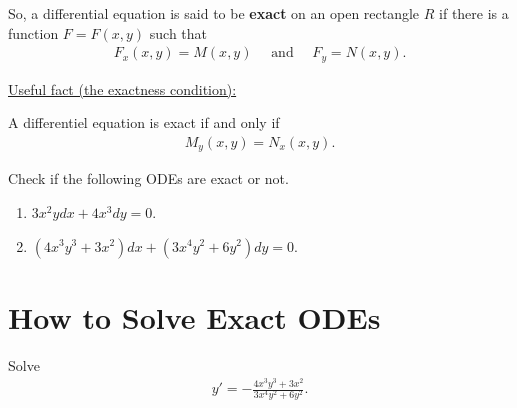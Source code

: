 \documentclass[12pt,a4paper]{article}
\newcounter{example}[section]
\begin{document}
	\newpage
	
	So, a differential equation is said to be \textbf{exact} on an open rectangle $R$ if there is a function $F = F(x, y)$ such that
		\begin{align*}
		F_x (x, y) = M (x, y) \quad \text{ and } \quad F_y = N (x, y) .
		\end{align*}
		
	\underline{Useful fact (the exactness condition):}
	
	A differentiel equation is exact if and only if
		\begin{align*}
		M_y (x, y) = N_x (x, y) .
		\end{align*}
	
	\vspace*{16pt}
	
	\begin{example}
	Check if the following ODEs are exact or not.
		\begin{enumerate}
		\item $3x^2 y dx + 4x^3 dy = 0$.
		\item $(4x^3 y^3 + 3x^2)dx + (3x^4 y^2 + 6y^2) dy = 0$.
		\end{enumerate}
	\end{example}
	
	\newpage
	
	\section{How to Solve Exact ODEs}
	
	\begin{example}
	Solve
		\begin{align*}
		y' = -\frac{4x^3 y^3 + 3x^2}{3x^4 y^2 + 6y^2} .
		\end{align*}
	\end{example}
	
	\newpage
	
\end{document}
